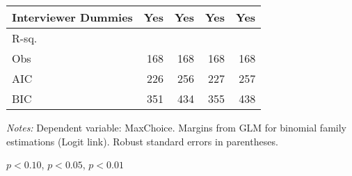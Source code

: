 \begin{table}[htbp]
\begin{threeparttable}
\begin{tabular}{l*{4}{D{.}{.}{-1}}}
Interviewer Dummies &                 Yes   &                 Yes   &                 Yes   &                 Yes   \\
\midrule
R-sq.               &                       &                       &                       &                       \\
Obs                 &                 168   &                 168   &                 168   &                 168   \\
AIC                 &                 226   &                 256   &                 227   &                 257   \\
BIC                 &                 351   &                 434   &                 355   &                 438   \\
\bottomrule
\end{tabular}
\begin{tablenotes}
\footnotesize
\item \textit{Notes:} Dependent variable: MaxChoice. Margins from GLM for binomial family estimations (Logit link). Robust standard errors in parentheses.
\item \sym{*} \(p<0.10\), \sym{**} \(p<0.05\), \sym{***} \(p<0.01\)
\end{tablenotes}
\end{threeparttable}
\label{tab:maxchoice_mathaltr}
\end{table}
